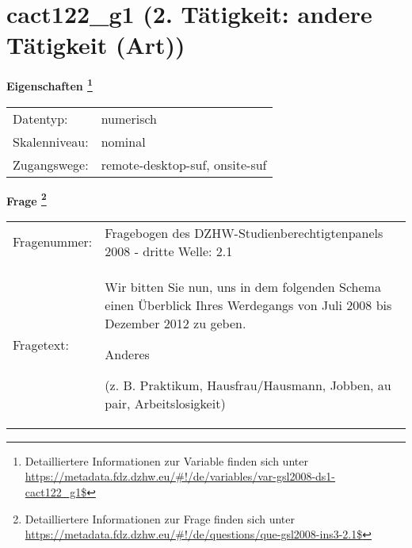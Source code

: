 
    \setcounter{footnote}{0}

    \vspace*{-1.8cm}
	\section{cact122\_g1 (2. Tätigkeit: andere Tätigkeit (Art))}
	\label{section:cact122_g1}



    \vspace*{0.5cm}
    \noindent\textbf{Eigenschaften
	\footnote{Detailliertere Informationen zur Variable finden sich unter
		\url{https://metadata.fdz.dzhw.eu/\#!/de/variables/var-gsl2008-ds1-cact122_g1$}}}\\
	\begin{tabularx}{\hsize}{@{}lX}
	Datentyp: & numerisch \\
	Skalenniveau: & nominal \\
	Zugangswege: &
	  remote-desktop-suf, 
	  onsite-suf
 \\
    \end{tabularx}



				\vspace*{0.5cm}
                \noindent\textbf{Frage
	                \footnote{Detailliertere Informationen zur Frage finden sich unter
		              \url{https://metadata.fdz.dzhw.eu/\#!/de/questions/que-gsl2008-ins3-2.1$}}}\\
				\begin{tabularx}{\hsize}{@{}lX}
					Fragenummer: &
					  Fragebogen des DZHW-Studienberechtigtenpanels 2008 - dritte Welle:
					  2.1
 \\
					Fragetext: & Wir bitten Sie nun, uns in dem folgenden Schema einen Überblick Ihres Werdegangs von Juli 2008 bis Dezember 2012 zu geben.\par  Anderes\par  (z. B. Praktikum, Hausfrau/Hausmann, Jobben, au pair, Arbeitslosigkeit) \\
				\end{tabularx}





